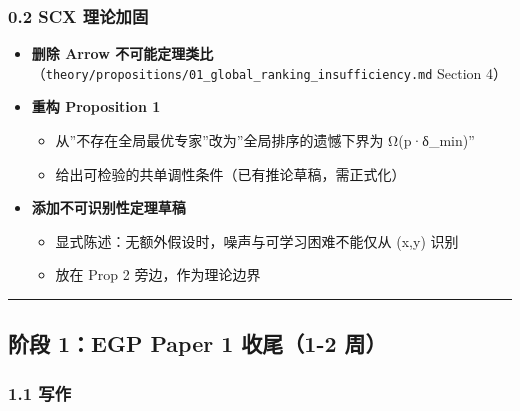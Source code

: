 \documentclass[
  12pt,
]{ctexart}
\providecommand{\tightlist}{%
  \setlength{\itemsep}{0pt}\setlength{\parskip}{0pt}}
\begin{document}
\subsubsection{0.2 SCX 理论加固}\label{scx-ux7406ux8bbaux52a0ux56fa}

\begin{itemize}
\tightlist
\item[$\square$]
  \textbf{删除 Arrow
  不可能定理类比}（\texttt{theory/propositions/01\_global\_ranking\_insufficiency.md}
  Section 4）
\item[$\square$]
  \textbf{重构 Proposition 1}

  \begin{itemize}
  \tightlist
  \item
    从''不存在全局最优专家''改为''全局排序的遗憾下界为 Ω(p·δ\_min)''
  \item
    给出可检验的共单调性条件（已有推论草稿，需正式化）
  \end{itemize}
\item[$\square$]
  \textbf{添加不可识别性定理草稿}

  \begin{itemize}
  \tightlist
  \item
    显式陈述：无额外假设时，噪声与可学习困难不能仅从 (x,y) 识别
  \item
    放在 Prop 2 旁边，作为理论边界
  \end{itemize}
\end{itemize}

\begin{center}\rule{0.5\linewidth}{0.5pt}\end{center}

\subsection{阶段 1：EGP Paper 1 收尾（1-2
周）}\label{ux9636ux6bb5-1egp-paper-1-ux6536ux5c3e1-2-ux5468}

\subsubsection{1.1 写作}\label{ux5199ux4f5c}
\end{document}
